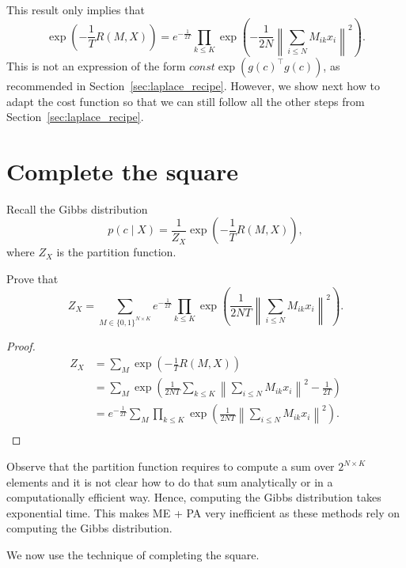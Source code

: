 This result only implies that
%
\begin{equation}
\exp\left(-\frac{1}{T}R(M, X)\right) = e^{-\frac{1}{2T}}\prod_{k \leq K}\exp\left(-\frac{1}{2N}\left\|\sum_{i \leq N}M_{ik}x_i\right\|^2\right).
\end{equation}
%
This is not an expression of the form $\textit{const} \exp\left(g(c)^\top g(c)\right)$, as recommended in Section~\ref{sec:laplace_recipe}. However, we show next how to adapt the cost function so that we can still follow all the other steps from Section~\ref{sec:laplace_recipe}.

\section{Complete the square}

Recall the Gibbs distribution
%
$$p(c \mid X) = \frac{1}{Z_X}\exp\left(-\frac{1}{T}R(M, X)\right),$$
%
where $Z_X$ is the partition function. 

\begin{exercise}
Prove that
%
\begin{equation}
Z_X = \sum_{M \in \{0, 1\}^{N \times K}}e^{-\frac{1}{2T}}\prod_{k \leq K} \exp\left(\frac{1}{2NT}\left\|\sum_{i \leq N} M_{ik}x_i\right\|^2\right).
\label{eq:partition_function}
\end{equation}
%
\end{exercise}

\begin{proof}
\begin{align*}
Z_X &= \sum_{M} \exp\left(-\frac{1}{T}R(M, X)\right)\\
&= \sum_{M} \exp\left(\frac{1}{2NT}\sum_{k \leq K}\left\|\sum_{i \leq N} M_{ik}x_i\right\|^2 - \frac{1}{2T}\right)\\
&= e^{-\frac{1}{2T}}\sum_{M} \prod_{k \leq K}\exp\left(\frac{1}{2NT}\left\|\sum_{i \leq N} M_{ik}x_i\right\|^2\right).\\
\end{align*}
\end{proof}

Observe that the partition function requires to compute a sum over $2^{N \times K}$ elements and it is not clear how to do that sum analytically or in a computationally efficient way. Hence, computing the Gibbs distribution takes exponential time. This makes ME + PA very inefficient as these methods rely on computing the Gibbs distribution.

We now use the technique of completing the square.

